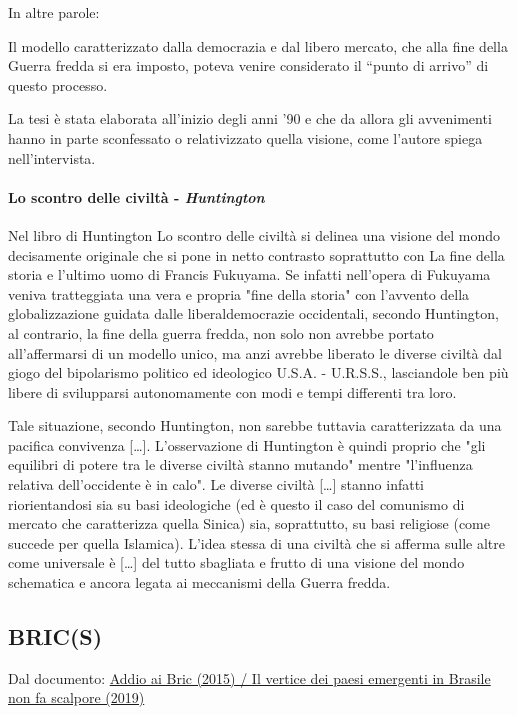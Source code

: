 \documentclass{article}
\begin{document}
In altre parole:

Il modello caratterizzato dalla democrazia e dal libero mercato, che alla fine della Guerra
fredda si era imposto, poteva venire considerato il “punto di arrivo” di questo processo.

La tesi è stata elaborata all’inizio degli anni ’90 e che da allora gli avvenimenti hanno in
parte sconfessato o relativizzato quella visione, come l’autore spiega nell’intervista. 

\paragraph{Lo scontro delle civiltà - \textit{Huntington}} \phantom{}

Nel libro di Huntington Lo scontro delle civiltà si delinea una visione del mondo decisamente
originale che si pone in netto contrasto soprattutto con La fine della storia e l'ultimo uomo
di Francis Fukuyama. Se infatti nell'opera di Fukuyama veniva tratteggiata una vera e propria 
"fine della storia" con l'avvento della globalizzazione guidata dalle liberaldemocrazie 
occidentali, secondo Huntington, al contrario, la fine della guerra fredda, non solo non avrebbe
portato all'affermarsi di un modello unico, ma anzi avrebbe liberato le diverse civiltà dal
giogo del bipolarismo politico ed ideologico U.S.A. - U.R.S.S., lasciandole ben più libere di
svilupparsi autonomamente con modi e tempi differenti tra loro.

Tale situazione, secondo Huntington, non sarebbe tuttavia caratterizzata da una pacifica
convivenza […]. L'osservazione di Huntington è quindi proprio che "gli equilibri di potere tra
le diverse civiltà stanno mutando" mentre "l'influenza relativa dell'occidente è in calo".
Le diverse civiltà […] stanno infatti riorientandosi sia su basi ideologiche (ed è questo il
caso del comunismo di mercato che caratterizza quella Sinica) sia, soprattutto, su basi 
religiose (come succede per quella Islamica). L'idea stessa di una civiltà che si afferma sulle
altre come universale è […] del tutto sbagliata e frutto di una visione del mondo schematica e 
ancora legata ai meccanismi della Guerra fredda.

\subsection{BRIC(S)}
Dal documento: \href{https://github.com/matteofrongillo/passerella/blob/main/Geografia/media/Internazionale-BRICS-entrambi.pdf?raw=true}
{Addio ai Bric (2015) / Il vertice dei paesi emergenti in Brasile non fa scalpore (2019)}
\end{document}
